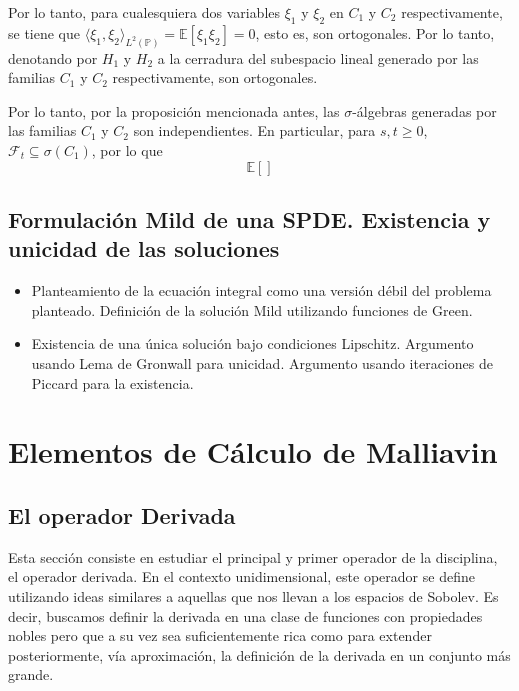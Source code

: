 \documentclass[letterpaper,twoside]{book}
\newcommand{\F}{\mathcal{F}}
\newcommand{\E}{\mathbb{E}}
\renewcommand{\P}{\mathbb{P}}
\newcommand{\1}{\mathds{1}}
\theoremstyle{definition}
\theoremstyle{definition}
\theoremstyle{definition}
\theoremstyle{definition}
\theoremstyle{definition}
\theoremstyle{definition}
\theoremstyle{definition}
\begin{document}
Por lo tanto, para cualesquiera dos variables $\xi_1$ y $\xi_2$ en $C_1$ y $C_2$ respectivamente, se tiene que $\langle \xi_1,\xi_2\rangle_{L^2(\P)}= \E\left[\xi_1\xi_2\right]=0$, esto es, son ortogonales. Por lo tanto, denotando por $H_1$ y $H_2$ a la cerradura del subespacio lineal generado por las familias $C_1$ y $C_2$ respectivamente, son ortogonales.

Por lo tanto, por la proposición mencionada antes, las $\sigma$-álgebras generadas por las familias $C_1$ y $C_2$ son independientes. En particular, para $s,t\geq0$, $\F_t\subseteq \sigma(C_1)$, por lo que 
\[
\E\left[\right]
\]





\section{Formulación Mild de una SPDE. Existencia y unicidad de las soluciones}
\begin{itemize}
    \item Planteamiento de la ecuación integral como una versión débil del problema planteado. Definición de la solución Mild utilizando funciones de Green.
    \item Existencia de una única solución bajo condiciones Lipschitz. Argumento usando Lema de Gronwall para unicidad. Argumento usando iteraciones de Piccard para la existencia.
\end{itemize}

\chapter{Elementos de Cálculo de Malliavin}%
\section{El operador Derivada}
Esta sección consiste en estudiar el principal y primer operador de la disciplina, el operador derivada. En el contexto unidimensional, este operador se define utilizando
ideas similares a aquellas que nos llevan a los espacios de Sobolev. Es decir, buscamos definir la derivada en una clase de funciones con propiedades nobles pero 
que a su vez sea suficientemente rica como para extender posteriormente, vía aproximación, la definición de la derivada en un conjunto más grande.
\end{document}
